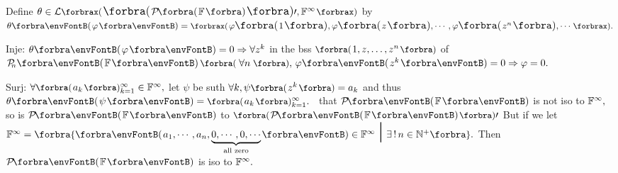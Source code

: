 {\par\quad
{Define $\def\envFont{\small}\theta\in\Lm[\XPar]{\envFontDefault\BigPar{\PoFi}\apostrophe,\Fbb^{\infty}\def\envFont{\small}}$ by $\theta\Par{\varphi}=\def\envFont{\small}\XPar{\envFontDefault\varphi\BigPar{1},\varphi\BigPar{z},\cdots,\varphi\BigPar{z^n},\cdots\def\envFont{\small}}.$}\vspace{3pt}\par\quad
{Inje: $\theta\Par{\varphi}=0\Rightarrow \forall z^k$ in the bss $\BigPar{1,z,\dots,z^n}$ of $\PoF{n}\,\BigPar{\,\forall n\,},\,\varphi\Par{z^k}=0\Rightarrow\varphi=0.$}\par\quad
{ }\vspace{3pt}\par\quad
{Surj: $\forall \BigPar{a_k}{_{k=1}^\infty}\in\Fbb^\infty,$ let $\psi$ be suth $\forall k,\psi\BigPar{z^k}=a_k$  and thus $\theta\Par{\psi}=\BigPar{a_k}{_{k=1}^\infty}.$}\PfEnd\vspace{6pt}
\Comment \,\,\,\NOTICE that $\PoFi$ is not iso to ${\mathbb{F}}^\infty,$ so is $\PoFi$ to $\BigPar{\PoFi}\apostrophe$\parCom
But if we let $\Fbb^\infty=\Bra{\Par{a_1,\cdots,a_n,\underbrace{0,\cdots,0,\cdots}_\text{all zero}\!}\in\Fbb^\infty\;\text{\envFontHuge\envFontA\mmid}\;\exists\,!\,n\in\Nbp}.$ Then $\PoFi$ is iso to ${\mathbb{F}}^\infty.$\par\vspace{10pt}
\SepLine
}

